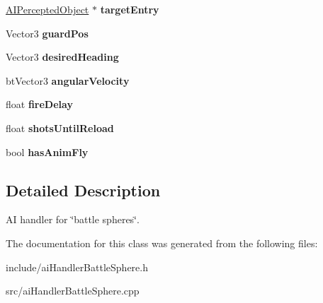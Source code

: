 \begin{DoxyCompactItemize}
\item 
\hypertarget{classAIHandlerBattleSphere_ab2333acfea37dffe4e725c1d4c8ab2e3}{
\hyperlink{classAIPerceptedObject}{\-A\-I\-Percepted\-Object} $\ast$ {\bfseries target\-Entry}}
\label{dc/dfb/classAIHandlerBattleSphere_ab2333acfea37dffe4e725c1d4c8ab2e3}

\item 
\hypertarget{classAIHandlerBattleSphere_adcfa4b0ce2dc764301502c17e036ee93}{
\-Vector3 {\bfseries guard\-Pos}}
\label{dc/dfb/classAIHandlerBattleSphere_adcfa4b0ce2dc764301502c17e036ee93}

\item 
\hypertarget{classAIHandlerBattleSphere_aa9862ca6087a1b725ae5a7f7b9782ea1}{
\-Vector3 {\bfseries desired\-Heading}}
\label{dc/dfb/classAIHandlerBattleSphere_aa9862ca6087a1b725ae5a7f7b9782ea1}

\item 
\hypertarget{classAIHandlerBattleSphere_affafec32a02b57f3489b67b706380758}{
bt\-Vector3 {\bfseries angular\-Velocity}}
\label{dc/dfb/classAIHandlerBattleSphere_affafec32a02b57f3489b67b706380758}

\item 
\hypertarget{classAIHandlerBattleSphere_a52c3883df286a98ad4ac0137c9c34977}{
float {\bfseries fire\-Delay}}
\label{dc/dfb/classAIHandlerBattleSphere_a52c3883df286a98ad4ac0137c9c34977}

\item 
\hypertarget{classAIHandlerBattleSphere_aa832386d7272e826655720caa6add4f7}{
float {\bfseries shots\-Until\-Reload}}
\label{dc/dfb/classAIHandlerBattleSphere_aa832386d7272e826655720caa6add4f7}

\item 
\hypertarget{classAIHandlerBattleSphere_a38c44396179e31f8c89b08b397a51e00}{
bool {\bfseries has\-Anim\-Fly}}
\label{dc/dfb/classAIHandlerBattleSphere_a38c44396179e31f8c89b08b397a51e00}

\end{DoxyCompactItemize}


\subsection{\-Detailed \-Description}
\-A\-I handler for \char`\"{}battle spheres\char`\"{}. 

\-The documentation for this class was generated from the following files\-:\begin{DoxyCompactItemize}
\item 
include/ai\-Handler\-Battle\-Sphere.\-h\item 
src/ai\-Handler\-Battle\-Sphere.\-cpp\end{DoxyCompactItemize}
